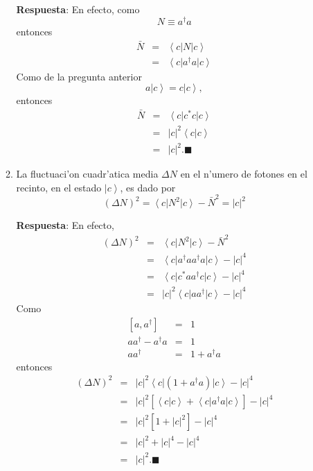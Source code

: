 \begin{enumerate}
\begin{enumerate}
\textbf{Respuesta}: En efecto, como
\begin{equation}
N\equiv a^{\dagger }a
\end{equation}
entonces 
\begin{eqnarray*}
\bar{N} &=&\left\langle c\right| N\left| c\right> \\
&=&\left\langle c\right| a^{\dagger }a\left| c\right> 
\end{eqnarray*}
Como de la pregunta anterior 
\begin{equation}
a\left| c\right> =c\left| c\right> ,
\end{equation}
entonces 
\begin{eqnarray*}
\bar{N} &=&\left\langle c\right| c^{\ast }c\left| c\right> \\
&=&\left| c\right| ^{2}\left\langle c|c\right> \\
&=&\left| c\right| ^{2}.\blacksquare 
\end{eqnarray*}

\item La fluctuaci'on cuadr'atica media $\Delta N$ en el n'umero
de fotones en el recinto, en el estado $\left| c\right> $, es dado por 
\begin{equation}
\left( \Delta N\right) ^{2}=\left\langle c\right| N^{2}\left| c\right>
-\bar{N}^{2}=\left| c\right| ^{2} 
\end{equation}

\textbf{Respuesta}: En efecto,
\begin{eqnarray*}
\left( \Delta N\right) ^{2} &=&\left\langle c\right| N^{2}\left|
c\right> -\bar{N}^{2} \\
&=&\left\langle c\right| a^{\dagger }aa^{\dagger }a\left| c\right>
-\left| c\right| ^{4} \\
&=&\left\langle c\right| c^{\ast }aa^{\dagger }c\left| c\right>
-\left| c\right| ^{4} \\
&=&\left| c\right| ^{2}\left\langle c\right| aa^{\dagger }\left|
c\right> -\left| c\right| ^{4}
\end{eqnarray*}
Como 
\begin{eqnarray*}
\left[ a,a^{\dagger }\right] &=&1 \\
aa^{\dagger }-a^{\dagger }a &=&1 \\
aa^{\dagger } &=&1+a^{\dagger }a
\end{eqnarray*}
entonces 
\begin{eqnarray*}
\left( \Delta N\right) ^{2} &=&\left| c\right| ^{2}\left\langle c\right|
\left( 1+a^{\dagger }a\right) \left| c\right> -\left| c\right| ^{4} \\
&=&\left| c\right| ^{2}\left[ \left\langle c|c\right> +\left\langle
c\right| a^{\dagger }a\left| c\right> \right] -\left| c\right| ^{4} \\
&=&\left| c\right| ^{2}\left[ 1+\left| c\right| ^{2}\right] -\left| c\right|
^{4} \\
&=&\left| c\right| ^{2}+\left| c\right| ^{4}-\left| c\right| ^{4} \\
&=&\left| c\right| ^{2}.\blacksquare
\end{eqnarray*}


\end{enumerate}
\end{enumerate}
